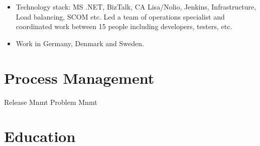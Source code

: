 \documentclass[11pt,a4paper,sans]{moderncv}
\begin{document}
{\begin{itemize}
    \item Technology stack: MS .NET, BizTalk, CA Lisa/Nolio, Jenkins, Infrastructure, Load balancing, SCOM etc. Led a team of operations specialist and coordinated work between 15 people including developers, testers, etc. 
    
    \item Work in Germany, Denmark and Sweden. 
\end{itemize}

\section{Process Management}
 {Release Mnmt}
 {Problem Mnmt}


\section{Education}


}
\end{document}

